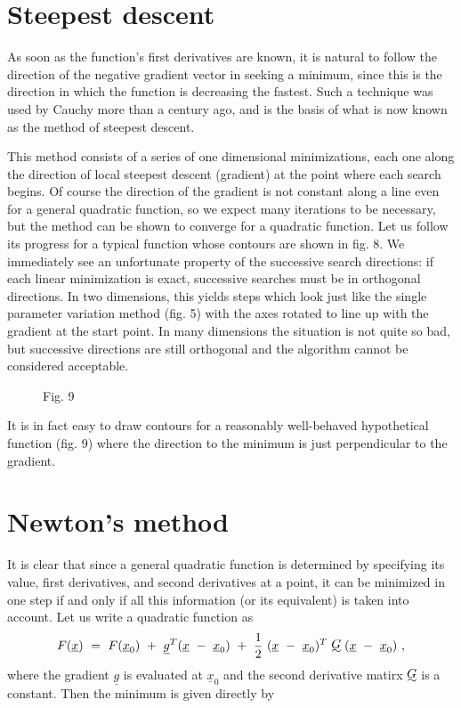 \section{Steepest descent}
 
     As soon as the function's first derivatives are known, it is natural
to follow the direction of the negative gradient vector in seeking a
minimum, since this is the direction in which the function is decreasing
the fastest.  Such a technique was used by Cauchy more than a century
ago, and is the basis of what is now known as the method of steepest
descent.
 
     This method consists of a series of one dimensional minimizations,
each one along the direction of local steepest descent (gradient) at the
point where each search begins.  Of course the direction of the gradient
is not constant along a line even for a general quadratic function, so
we expect many iterations to be necessary, but the method can be shown
to converge for a quadratic function. 
 Let us follow its progress
 for a typical function whose contours are shown
 in fig. 8.
   We immediately see an unfortunate
 property of the successive search
 directions: if each linear minimization is exact,
 successive searches must be in orthogonal
directions.  In two dimensions,
this yields steps which look just
like the single parameter variation method (fig. 5) with the axes rotated to
line up with the gradient at the start point.  In many dimensions the
situation is not quite so bad, but successive directions are still
orthogonal and the algorithm cannot be considered acceptable.
\begin{figure}
\begin{center}\mbox{}\end{center}
 
\begin{center}
Fig. 9
\end{center}
\end{figure}
     It is in fact easy to draw contours for a reasonably well-behaved
 hypothetical function (fig. 9)
 where the direction to the
 minimum is just perpendicular to the gradient.
 
\section{Newton's method}
 
     It is clear that since a general quadratic function is determined
by specifying its value, first derivatives, and second derivatives at a
point, it can be minimized in one step if and only if all this information
(or its equivalent) is taken into account.  Let us write a
quadratic function as
 $$F({\underline{x}})~=~F({\underline{x}}_0)~+~{\underline{g}}^T 
({\underline{x}}~-~{\underline{x}}_0)~+~{1\over 2}~({\underline{x}}~-~{\underline{x}}_0)^T~\UTG
   ({\underline{x}}~-~{\underline{x}}_0)~,$$
 where the gradient ${\underline{g}}$ is evaluated at ${\underline{x}}_0$ and the second derivative
matirx $\UTG$is a constant.  Then the minimum is given directly by
 
